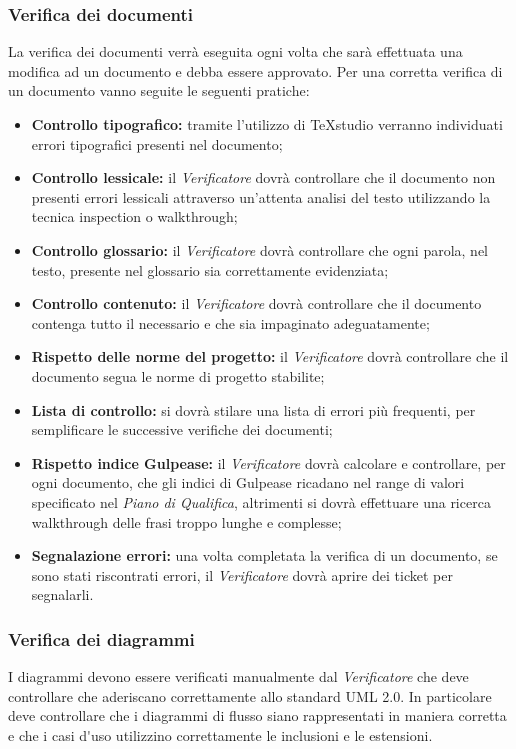 \subsubsection{Verifica dei documenti}
La verifica dei documenti verrà eseguita ogni volta che sarà effettuata una modifica ad un documento e debba essere approvato.
Per una corretta verifica di un documento vanno seguite le seguenti pratiche:

\begin{itemize}
	\item \textbf{Controllo tipografico: }tramite l'utilizzo di TeXstudio verranno individuati errori tipografici presenti nel documento;
	\item \textbf{Controllo lessicale: }il \textit{Verificatore} dovrà controllare che il documento non presenti errori lessicali attraverso un'attenta analisi del testo utilizzando la tecnica \gls{inspection} o \gls{walkthrough};
	\item \textbf{Controllo glossario: }il \textit{Verificatore} dovrà controllare che ogni parola, nel testo, presente nel glossario sia correttamente evidenziata;
	\item \textbf{Controllo contenuto: }il \textit{Verificatore} dovrà controllare che il documento contenga tutto il necessario e che sia impaginato adeguatamente;
	\item \textbf{Rispetto delle norme del progetto: }il \textit{Verificatore} dovrà controllare che il documento segua le norme di progetto stabilite;
	\item \textbf{Lista di controllo: }si dovrà stilare una lista di errori più frequenti, per semplificare le successive verifiche dei documenti;
	\item \textbf{Rispetto \gls{indice Gulpease}: }il \textit{Verificatore} dovrà calcolare e controllare, per ogni documento, che gli \gls{indici di Gulpease} ricadano nel range di valori specificato nel \textit{Piano di Qualifica}, altrimenti si dovrà effettuare una ricerca \gls{walkthrough} delle frasi troppo lunghe e complesse;
	\item \textbf{Segnalazione errori: }una volta completata la verifica di un documento, se sono stati riscontrati errori, il \textit{Verificatore} dovrà aprire dei \gls{ticket} per segnalarli.
\end{itemize}
	
\subsubsection{Verifica dei diagrammi}
I diagrammi devono essere verificati manualmente dal \textit{Verificatore} che deve controllare che aderiscano correttamente allo standard \gls{UML} 2.0.
In particolare deve controllare che i diagrammi di flusso siano rappresentati in maniera corretta e che i \gls{casi d'uso} utilizzino correttamente le inclusioni e le estensioni.

